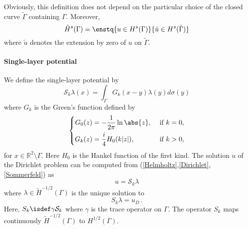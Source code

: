 \documentclass[a4paper]{article}
\begin{document}
	Obviously, this definition does not depend on the particular choice of the closed curve $\tilde{\Gamma}$ containing $\Gamma$. Moreover,
	\[\tilde{H}^s(\Gamma) = \enstq{u \in H^s(\Gamma)}{\tilde{u} \in H^s(\tilde{\Gamma})}\]
	where $\tilde{u}$ denotes the extension by zero of $u$ on $\tilde{\Gamma}$.
	
	\paragraph{Single-layer potential}  
	We define the single-layer potential by
	\begin{equation}
	\mathcal{S}_k\lambda(x) = \int_{\Gamma}G_k(x-y)\lambda(y)d\sigma(y)
	\label{defSk}
	\end{equation}
	where $G_k$ is the Green's function defined by 
	\begin{equation}
	\left\{
	\begin{aligned}
	G_0(z) &= -\dfrac{1}{2\pi} \ln \abs{z}, && \text{ if } k= 0,\\
	G_k(z) &= \frac{i}{4}H_0(k|z|), && \text{ if } k > 0,
	\end{aligned} \right.
	\end{equation} 
	for $x\in \mathbb{R}^2\setminus \Gamma$. Here $H_0$ is the Hankel function of the first kind. 
	The solution $u$ of the Dirichlet problem can be computed from (\ref{Helmholtz},\ref{Dirichlet},\ref{Sommerfeld}) as
	\begin{equation}
	u = \mathcal{S}_k \lambda
	\end{equation}
	where $\lambda \in \tilde{H}^{-1/2}(\Gamma)$ is the unique solution to 
	\begin{equation}
	S_k \lambda = u_D\,.
	\label{Sklambda}
	\end{equation}
	Here, $S_k \isdef \gamma \mathcal{S}_k$ where $\gamma$ is the trace operator on $\Gamma$. The operator $S_k$ maps continuously $\tilde{H}^{-1/2}(\Gamma)$ to $H^{1/2}(\Gamma)$.
	
\end{document}
